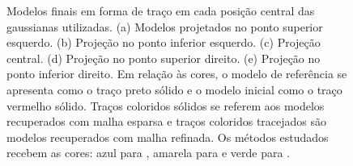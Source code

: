 \begin{figure}[H]
	
	\caption{Modelos finais em forma de traço em cada posição central das gaussianas utilizadas. (a) Modelos projetados no ponto superior esquerdo. (b) Projeção no ponto inferior esquerdo. (c) Projeção central. (d) Projeção no ponto superior direito. (e) Projeção no ponto inferior direito. Em relação às cores, o modelo de referência se apresenta como o traço preto sólido e o modelo inicial como o traço vermelho sólido. Traços coloridos sólidos se referem aos modelos recuperados com malha esparsa e traços coloridos tracejados são modelos recuperados com malha refinada. Os métodos estudados recebem as cores: azul para , amarela para  e verde para .}
	\label{fig:}
\end{figure}



